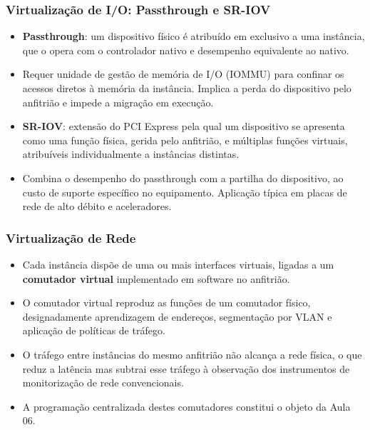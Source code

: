 \documentclass[aspectratio=169]{beamer}
\begin{document}
\begin{frame}
\frametitle{Virtualização de I/O: Passthrough e SR-IOV}
\begin{itemize}
    \setlength\itemsep{0.35cm}
    \item \textbf{Passthrough}: um dispositivo físico é atribuído em exclusivo a uma instância, que o opera com o controlador nativo e desempenho equivalente ao nativo.
    \item Requer unidade de gestão de memória de I/O (IOMMU) para confinar os acessos diretos à memória da instância. Implica a perda do dispositivo pelo anfitrião e impede a migração em execução.
    \item \textbf{SR-IOV}: extensão do PCI Express pela qual um dispositivo se apresenta como uma função física, gerida pelo anfitrião, e múltiplas funções virtuais, atribuíveis individualmente a instâncias distintas.
    \item Combina o desempenho do passthrough com a partilha do dispositivo, ao custo de suporte específico no equipamento. Aplicação típica em placas de rede de alto débito e aceleradores.
\end{itemize}
\end{frame}

\begin{frame}
\frametitle{Virtualização de Rede}
\begin{itemize}
    \setlength\itemsep{0.4cm}
    \item Cada instância dispõe de uma ou mais interfaces virtuais, ligadas a um \textbf{comutador virtual} implementado em software no anfitrião.
    \item O comutador virtual reproduz as funções de um comutador físico, designadamente aprendizagem de endereços, segmentação por VLAN e aplicação de políticas de tráfego.
    \item O tráfego entre instâncias do mesmo anfitrião não alcança a rede física, o que reduz a latência mas subtrai esse tráfego à observação dos instrumentos de monitorização de rede convencionais.
    \item A programação centralizada destes comutadores constitui o objeto da Aula 06.
\end{itemize}
\end{frame}
\end{document}
